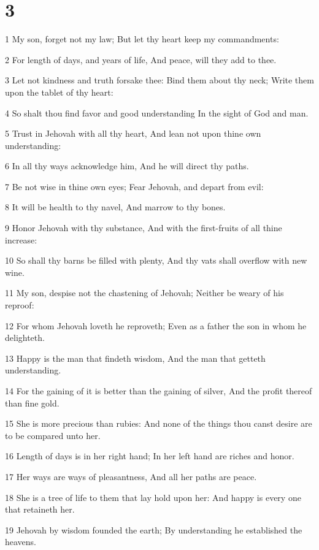 \chapter{3}

\par 1 My son, forget not my law; But let thy heart keep my commandments:
\par 2 For length of days, and years of life, And peace, will they add to thee.
\par 3 Let not kindness and truth forsake thee: Bind them about thy neck; Write them upon the tablet of thy heart:
\par 4 So shalt thou find favor and good understanding In the sight of God and man.
\par 5 Trust in Jehovah with all thy heart, And lean not upon thine own understanding:
\par 6 In all thy ways acknowledge him, And he will direct thy paths.
\par 7 Be not wise in thine own eyes; Fear Jehovah, and depart from evil:
\par 8 It will be health to thy navel, And marrow to thy bones.
\par 9 Honor Jehovah with thy substance, And with the first-fruits of all thine increase:
\par 10 So shall thy barns be filled with plenty, And thy vats shall overflow with new wine.
\par 11 My son, despise not the chastening of Jehovah; Neither be weary of his reproof:
\par 12 For whom Jehovah loveth he reproveth; Even as a father the son in whom he delighteth.
\par 13 Happy is the man that findeth wisdom, And the man that getteth understanding.
\par 14 For the gaining of it is better than the gaining of silver, And the profit thereof than fine gold.
\par 15 She is more precious than rubies: And none of the things thou canst desire are to be compared unto her.
\par 16 Length of days is in her right hand; In her left hand are riches and honor.
\par 17 Her ways are ways of pleasantness, And all her paths are peace.
\par 18 She is a tree of life to them that lay hold upon her: And happy is every one that retaineth her.
\par 19 Jehovah by wisdom founded the earth; By understanding he established the heavens.
